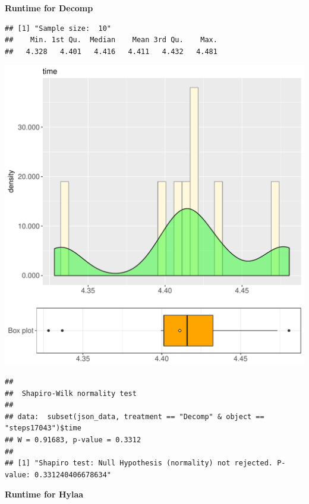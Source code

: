 \documentclass{article}\usepackage[]{graphicx}\usepackage[]{color}
\makeatletter
\def\maxwidth{ %
  \ifdim\Gin@nat@width>\linewidth
    \linewidth
  \else
    \Gin@nat@width
  \fi
}
\newenvironment{kframe}{%
 \def\at@end@of@kframe{}%
 \ifinner\ifhmode%
  \def\at@end@of@kframe{\end{minipage}}%
  \begin{minipage}{\columnwidth}%
 \fi\fi%
 \def\FrameCommand##1{\hskip\@totalleftmargin \hskip-\fboxsep
 \colorbox{shadecolor}{##1}\hskip-\fboxsep
     \hskip-\linewidth \hskip-\@totalleftmargin \hskip\columnwidth}%
 \MakeFramed {\advance\hsize-\width
   \@totalleftmargin\z@ \linewidth\hsize
   \@setminipage}}%
 {\par\unskip\endMakeFramed%
 \at@end@of@kframe}
\newenvironment{knitrout}{}{} %
\makeatother
\begin{document}
 \textbf{Runtime for Decomp}
\begin{knitrout}
\color{fgcolor}\begin{kframe}
\begin{verbatim}
## [1] "Sample size:  10"
##    Min. 1st Qu.  Median    Mean 3rd Qu.    Max. 
##   4.328   4.401   4.416   4.411   4.432   4.481
\end{verbatim}
\end{kframe}
\includegraphics[width=\maxwidth]{figure/RH2_Decomp_steps17043-1} 
\begin{kframe}\begin{verbatim}
## 
## 	Shapiro-Wilk normality test
## 
## data:  subset(json_data, treatment == "Decomp" & object == "steps17043")$time
## W = 0.91683, p-value = 0.3312
## 
## [1] "Shapiro test: Null Hypothesis (normality) not rejected. P-value: 0.331240406678634"
\end{verbatim}
\end{kframe}
\end{knitrout}
 \textbf{Runtime for Hylaa}
\end{document}
